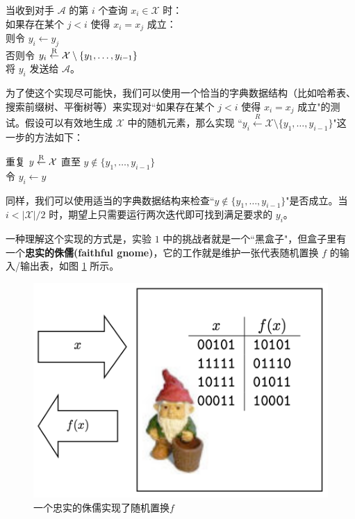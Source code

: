 \vspace*{5pt}

\hspace*{5pt} 当收到对手 $\mathcal{A}$ 的第 $i$ 个查询 $x_i\in\mathcal{X}$ 时：\\
\hspace*{50pt} 如果存在某个 $j<i$ 使得 $x_i=x_j$ 成立：\\
\hspace*{75pt} 则令 $y_i\leftarrow y_j$\\
\hspace*{75pt} 否则令 $y_i\overset{\rm R}\leftarrow\mathcal{X}\setminus\{y_1,\dots,y_{i-1}\}$\\
\hspace*{50pt} 将 $y_i$ 发送给 $\mathcal{A}$。

\vspace*{5pt}

\noindent
为了使这个实现尽可能快，我们可以使用一个恰当的字典数据结构（比如哈希表、搜索前缀树、平衡树等）来实现对``如果存在某个 $j<i$ 使得 $x_i=x_j$ 成立"的测试。假设可以有效地生成 $\mathcal{X}$ 中的随机元素，那么实现 ``$y_i\overset{R}\leftarrow\mathcal{X}\setminus\{y_1,\dots,y_{i-1}\}$"这一步的方法如下：

\vspace*{5pt}

\hspace*{5pt} 重复 $y\overset{\rm R}\leftarrow\mathcal{X}$ 直至 $y\notin\{y_1,\dots,y_{i-1}\}$\\
\hspace*{26pt} 令 $y_i\leftarrow y$

\vspace*{5pt}

\noindent
同样，我们可以使用适当的字典数据结构来检查``$y\notin\{y_1,\dots,y_{i-1}\}$"是否成立。当 $i<{|\mathcal{X}|}/{2}$ 时，期望上只需要运行两次迭代即可找到满足要求的 $y_i$。

一种理解这个实现的方式是，实验 $1$ 中的挑战者就是一个``黑盒子"，但盒子里有一个\textbf{忠实的侏儒(faithful gnome)}，它的工作就是维护一张代表随机置换 $f$ 的输入/输出表，如图 \ref{fig:4-3} 所示。

\begin{figure}
  \centering
  \includegraphics[width=0.55\linewidth]{figures/chapter4/fig3.png}
  \caption{一个忠实的侏儒实现了随机置换$f$}
  \label{fig:4-3}
\end{figure}

